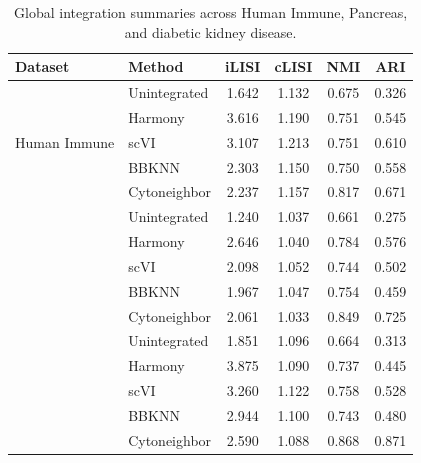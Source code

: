 \documentclass[11pt]{article}
\begin{document}
\begin{table}[htpb]
    \centering
    \caption{Global integration summaries across Human Immune, Pancreas, and diabetic kidney disease.}
    \label{tab:integration_summaries}
    {\fontsize{8}{9.2}\selectfont
    \setlength{\tabcolsep}{6pt}
    \begin{tabular}{llcccc}
        \toprule
        \textbf{Dataset} & \textbf{Method} & \textbf{iLISI} & \textbf{cLISI} & \textbf{NMI} & \textbf{ARI} \\
        \midrule

        \multirow{5}{*}{Human Immune}
         & Unintegrated & 1.642 & 1.132 & 0.675 & 0.326 \\
         & Harmony      & 3.616 & 1.190 & 0.751 & 0.545 \\
         & scVI         & 3.107 & 1.213 & 0.751 & 0.610 \\
         & BBKNN        & 2.303 & 1.150 & 0.750 & 0.558 \\
         & Cytoneighbor & 2.237 & 1.157 & 0.817 & 0.671 \\

        \addlinespace

        \multirow{5}{*}{Pancreas}
         & Unintegrated & 1.240 & 1.037 & 0.661 & 0.275 \\
         & Harmony      & 2.646 & 1.040 & 0.784 & 0.576 \\
         & scVI         & 2.098 & 1.052 & 0.744 & 0.502 \\
         & BBKNN        & 1.967 & 1.047 & 0.754 & 0.459 \\
         & Cytoneighbor & 2.061 & 1.033 & 0.849 & 0.725 \\

        \addlinespace

        \multirow{5}{*}{Diabetic Kidney Disease}
         & Unintegrated & 1.851 & 1.096 & 0.664 & 0.313 \\
         & Harmony      & 3.875 & 1.090 & 0.737 & 0.445 \\
         & scVI         & 3.260 & 1.122 & 0.758 & 0.528 \\
         & BBKNN        & 2.944 & 1.100 & 0.743 & 0.480 \\
         & Cytoneighbor & 2.590 & 1.088 & 0.868 & 0.871 \\

        \bottomrule
    \end{tabular}}
\end{table}
\end{document}
